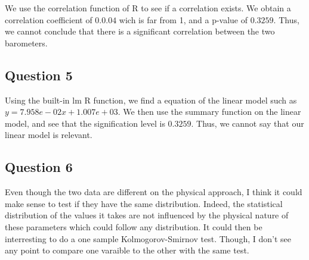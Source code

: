 \documentclass[12pt,a4paper]{article}
\begin{document}
We use the correlation function of R to see if a correlation exists. We obtain a correlation coefficient of $0.0.04$ wich is far from 1, and a p-value of $0.3259$. Thus, we cannot conclude that there is a significant correlation between the two barometers.

\subsection*{Question 5}
Using the built-in lm R function, we find a equation of the linear model such as $y = 7.958e-02x + 1.007e+03$. We then use the summary function on the linear model, and see that the signification level is $0.3259$. Thus, we cannot say that our linear model is relevant.

\subsection*{Question 6}
Even though the two data are different on the physical approach, I think it could make sense to test if they have the same distribution. Indeed, the statistical distribution of the values it takes are not influenced by the physical nature of these parameters which could follow any distribution. It could then be interresting to do a one sample Kolmogorov-Smirnov test. Though, I don't see any point to compare one varaible to the other with the same test.
\end{document}
